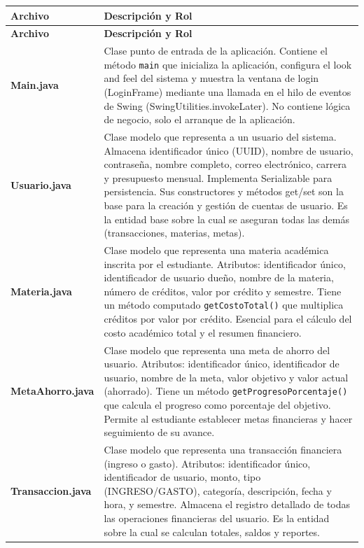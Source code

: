 \documentclass[utf8]{article}
\begin{document}
\begin{longtable}{p{0.15\linewidth}p{0.85\linewidth}}
\hline
\textbf{Archivo} & \textbf{Descripción y Rol} \\ \hline
\endfirsthead
\hline
\textbf{Archivo} & \textbf{Descripción y Rol} \\ \hline
\endhead
\hline
\endfoot
\hline
\endlastfoot
\textbf{Main.java} & Clase punto de entrada de la aplicación. Contiene el método \texttt{main} que inicializa la aplicación, configura el look and feel del sistema y muestra la ventana de login (LoginFrame) mediante una llamada en el hilo de eventos de Swing (SwingUtilities.invokeLater). No contiene lógica de negocio, solo el arranque de la aplicación. \\ \hline
\textbf{Usuario.java} & Clase modelo que representa a un usuario del sistema. Almacena identificador único (UUID), nombre de usuario, contraseña, nombre completo, correo electrónico, carrera y presupuesto mensual. Implementa Serializable para persistencia. Sus constructores y métodos get/set son la base para la creación y gestión de cuentas de usuario. Es la entidad base sobre la cual se aseguran todas las demás (transacciones, materias, metas). \\ \hline
\textbf{Materia.java} & Clase modelo que representa una materia académica inscrita por el estudiante. Atributos: identificador único, identificador de usuario dueño, nombre de la materia, número de créditos, valor por crédito y semestre. Tiene un método computado \texttt{getCostoTotal()} que multiplica créditos por valor por crédito. Esencial para el cálculo del costo académico total y el resumen financiero. \\ \hline
\textbf{MetaAhorro.java} & Clase modelo que representa una meta de ahorro del usuario. Atributos: identificador único, identificador de usuario, nombre de la meta, valor objetivo y valor actual (ahorrado). Tiene un método \texttt{getProgresoPorcentaje()} que calcula el progreso como porcentaje del objetivo. Permite al estudiante establecer metas financieras y hacer seguimiento de su avance. \\ \hline
\textbf{Transaccion.java} & Clase modelo que representa una transacción financiera (ingreso o gasto). Atributos: identificador único, identificador de usuario, monto, tipo (INGRESO/GASTO), categoría, descripción, fecha y hora, y semestre. Almacena el registro detallado de todas las operaciones financieras del usuario. Es la entidad sobre la cual se calculan totales, saldos y reportes. \\ \hline
\end{longtable}
\end{document}
